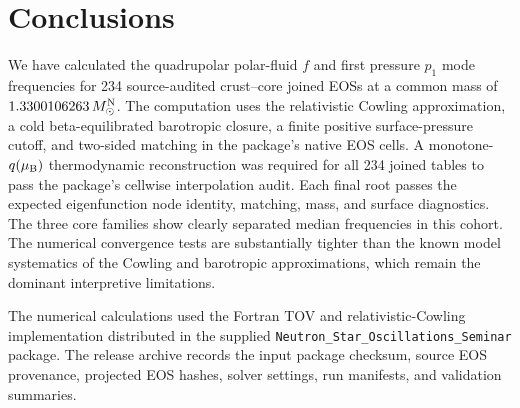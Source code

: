 \documentclass[aps,prd,twocolumn,superscriptaddress,nofootinbib]{revtex4-2}
\newcommand{\MsunN}{M_{\odot}^{\rm N}}
\newcommand{\mub}{\mu_{\rm B}}
\begin{document}
\section{Conclusions}

We have calculated the quadrupolar polar-fluid $f$ and first pressure $p_1$ mode frequencies for 234 source-audited crust--core joined EOSs at a common mass of $1.3300106263\,\MsunN$. The computation uses the relativistic Cowling approximation, a cold beta-equilibrated barotropic closure, a finite positive surface-pressure cutoff, and two-sided matching in the package's native EOS cells. A monotone-$q(\mub)$ thermodynamic reconstruction was required for all 234 joined tables to pass the package's cellwise interpolation audit. Each final root passes the expected eigenfunction node identity, matching, mass, and surface diagnostics. The three core families show clearly separated median frequencies in this cohort. The numerical convergence tests are substantially tighter than the known model systematics of the Cowling and barotropic approximations, which remain the dominant interpretive limitations.

\begin{acknowledgments}
The numerical calculations used the Fortran TOV and relativistic-Cowling implementation distributed in the supplied \texttt{Neutron\_Star\_Oscillations\_Seminar} package. The release archive records the input package checksum, source EOS provenance, projected EOS hashes, solver settings, run manifests, and validation summaries.
\end{acknowledgments}



\end{document}
